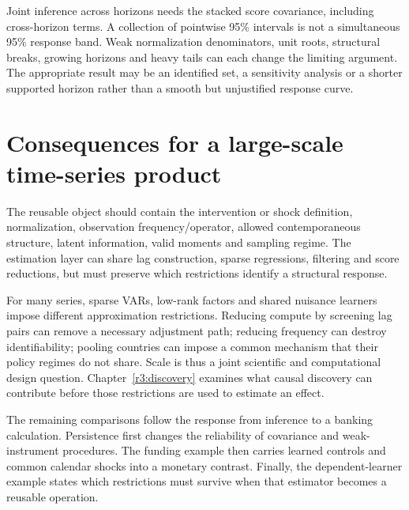 Joint inference across horizons needs the stacked score covariance,
including cross-horizon terms. A collection of pointwise 95\% intervals
is not a simultaneous 95\% response band. Weak normalization denominators,
unit roots, structural breaks, growing horizons and heavy tails can
each change the limiting argument. The appropriate result may be an
identified set, a sensitivity analysis or a shorter supported horizon
rather than a smooth but unjustified response curve.



\section{Consequences for a large-scale time-series product}
The reusable object should contain the intervention or shock definition,
normalization, observation frequency/operator, allowed contemporaneous
structure, latent information, valid moments and sampling regime.
The estimation layer can share lag construction, sparse regressions,
filtering and score reductions, but must preserve which restrictions
identify a structural response.

For many series, sparse VARs, low-rank factors and shared nuisance
learners impose different approximation restrictions. Reducing compute
by screening lag pairs can remove a necessary adjustment path; reducing
frequency can destroy identifiability; pooling countries can impose a
common mechanism that their policy regimes do not share. Scale is thus
a joint scientific and computational design question. Chapter~\ref{r3:discovery} examines what causal discovery can contribute
before those restrictions are used to estimate an effect.

The remaining comparisons follow the response from inference to a banking
calculation. Persistence first changes the reliability of covariance and
weak-instrument procedures. The funding example then carries learned
controls and common calendar shocks into a monetary contrast. Finally,
the dependent-learner example states which restrictions must survive when
that estimator becomes a reusable operation.





